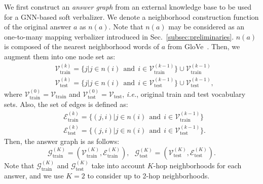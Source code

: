 \documentclass[10pt,twocolumn,letterpaper]{article}
\begin{document}
We first construct an \textit{answer graph} from an external knowledge base to be used for a GNN-based soft verbalizer.
We denote a neighborhood construction function of the original answer $a$ as $n(a)$.
Note that $n(a)$ may be considered as an one-to-many mapping verbalizer introduced in Sec.~\ref{subsec:preliminaries}.
$n(a)$ is composed of the nearest neighborhood words of $a$ from GloVe~\cite{pennington2014glove}.
Then, we augment them into one node set as:
\begin{equation}
    \begin{split}
        & \mathcal{V}_\text{train}^{(k)} = \{j|j \in n(i) \:\:\text{and}\:\: i \in \mathcal{V}_\text{train}^{(k-1)}\} \cup \mathcal{V}_\text{train}^{(k-1)} \\
        & \mathcal{V}_\text{test}^{(k)} = \{j|j \in n(i) \:\:\text{and}\:\: i \in \mathcal{V}_\text{test}^{(k-1)}\} \cup \mathcal{V}_\text{test}^{(k-1)},
    \end{split}
\end{equation}
where $\mathcal{V}_\text{train}^{(0)} = \mathcal{V}_\text{train}$ and $\mathcal{V}_\text{test}^{(0)} = \mathcal{V}_\text{test}$, \textit{i.e.}, original train and test vocabulary sets.
Also, the set of edges is defined as:
\begin{equation}
    \begin{split}
        & \mathcal{E}_\text{train}^{(k)} = \{(j, i)|j \in n(i) \:\:\text{and}\:\: i \in \mathcal{V}_\text{train}^{(k-1)}\} \\
        & \mathcal{E}_\text{test}^{(k)} = \{(j, i)|j \in n(i) \:\:\text{and}\:\: i \in \mathcal{V}_\text{test}^{(k-1)}\}.
    \end{split}
\end{equation}
Then, the answer graph is as follows:
\begin{equation}
    \mathcal{G}_\text{train}^{(K)} = (\mathcal{V}_\text{train}^{(K)}, \mathcal{E}_\text{train}^{(K)}), \:\:\:
    \mathcal{G}_\text{test}^{(K)} = (\mathcal{V}_\text{test}^{(K)}, \mathcal{E}_\text{test}^{(K)}).
\end{equation}
Note that $\mathcal{G}_\text{train}^{(K)}$ and $\mathcal{G}_\text{test}^{(K)}$ take into account $K$-hop neighborhoods for each answer, and we use $K = 2$ to consider up to 2-hop neighborhoods.
\end{document}
